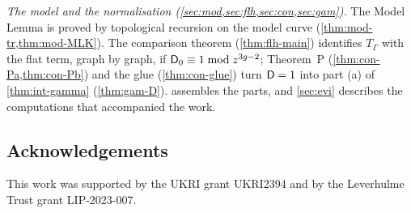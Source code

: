 \emph{The model and the normalisation (\cref{sec:mod,sec:flh,sec:con,sec:gam}).} The Model Lemma is proved by topological recursion on the model curve (\cref{thm:mod-tr,thm:mod-MLK}). The comparison theorem (\cref{thm:flh-main}) identifies $T_\Gamma$ with the flat term, graph by graph, if $\mathsf{D}_0\equiv1\bmod z^{3g-2}$; Theorem~P (\cref{thm:con-Pa,thm:con-Pb}) and the glue (\cref{thm:con-glue}) turn $\mathsf{D}=1$ into part (a) of \cref{thm:int-gamma} (\cref{thm:gam-D}).  assembles the parts, and \cref{sec:evi} describes the computations that accompanied the work.

\subsection*{Acknowledgements}

This work was supported by the UKRI grant UKRI2394 and by the Leverhulme Trust grant LIP-2023-007.
